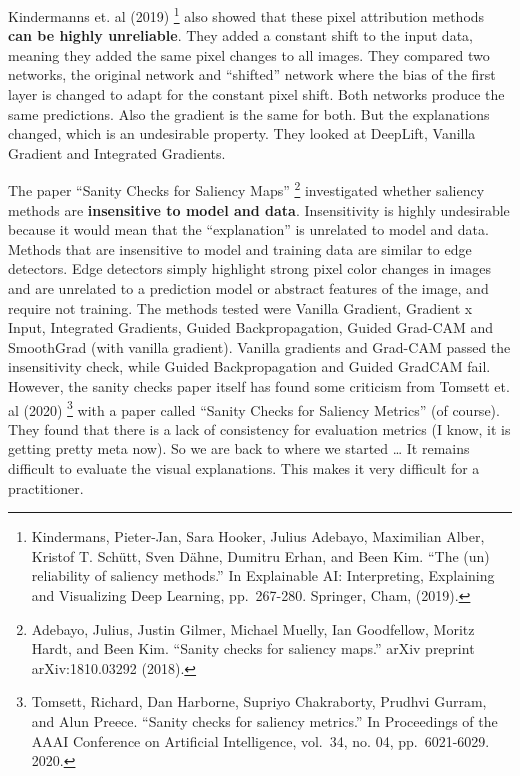 \documentclass[12pt,]{krantz}
\begin{document}
Kindermanns et. al (2019) \footnote{Kindermans, Pieter-Jan, Sara Hooker,
  Julius Adebayo, Maximilian Alber, Kristof T. Schütt, Sven Dähne,
  Dumitru Erhan, and Been Kim. ``The (un) reliability of saliency
  methods.'' In Explainable AI: Interpreting, Explaining and Visualizing
  Deep Learning, pp.~267-280. Springer, Cham, (2019).} also showed that
these pixel attribution methods \textbf{can be highly unreliable}. They
added a constant shift to the input data, meaning they added the same
pixel changes to all images. They compared two networks, the original
network and ``shifted'' network where the bias of the first layer is
changed to adapt for the constant pixel shift. Both networks produce the
same predictions. Also the gradient is the same for both. But the
explanations changed, which is an undesirable property. They looked at
DeepLift, Vanilla Gradient and Integrated Gradients.

The paper ``Sanity Checks for Saliency Maps'' \footnote{Adebayo, Julius,
  Justin Gilmer, Michael Muelly, Ian Goodfellow, Moritz Hardt, and Been
  Kim. ``Sanity checks for saliency maps.'' arXiv preprint
  arXiv:1810.03292 (2018).} investigated whether saliency methods are
\textbf{insensitive to model and data}. Insensitivity is highly
undesirable because it would mean that the ``explanation'' is unrelated
to model and data. Methods that are insensitive to model and training
data are similar to edge detectors. Edge detectors simply highlight
strong pixel color changes in images and are unrelated to a prediction
model or abstract features of the image, and require not training. The
methods tested were Vanilla Gradient, Gradient x Input, Integrated
Gradients, Guided Backpropagation, Guided Grad-CAM and SmoothGrad (with
vanilla gradient). Vanilla gradients and Grad-CAM passed the
insensitivity check, while Guided Backpropagation and Guided GradCAM
fail. However, the sanity checks paper itself has found some criticism
from Tomsett et. al (2020) \footnote{Tomsett, Richard, Dan Harborne,
  Supriyo Chakraborty, Prudhvi Gurram, and Alun Preece. ``Sanity checks
  for saliency metrics.'' In Proceedings of the AAAI Conference on
  Artificial Intelligence, vol.~34, no. 04, pp.~6021-6029. 2020.} with a
paper called ``Sanity Checks for Saliency Metrics'' (of course). They
found that there is a lack of consistency for evaluation metrics (I
know, it is getting pretty meta now). So we are back to where we started
\ldots{} It remains difficult to evaluate the visual explanations. This
makes it very difficult for a practitioner.
\end{document}
